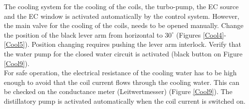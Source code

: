 \documentclass[fleqn,a4paper,20pt]{article}
\begin{document}
The cooling system for the cooling of the coils, the turbo-pump, the EC source and the EC window is activated automatically by the control system. However, the main valve for the cooling of the coils, needs to be opened manually. Change the position of the black lever arm from horizontal to $30^\circ$ (Figures \ref{Cool4}-\ref{Cool5}). Position changing requires pushing the lever arm interlock. Verify that the water pump for the closed water circuit is activated (black button on Figure \ref{Cool9}).\\

For safe operation, the electrical resistance of the cooling water has to be high enough to avoid that the coil current flows through the cooling water. This can be checked on the conductance meter (Leitwertmesser) (Figure \ref{Cool9}). The distillatory pump  is activated automatically when the coil current is switched on.\\
\end{document}

